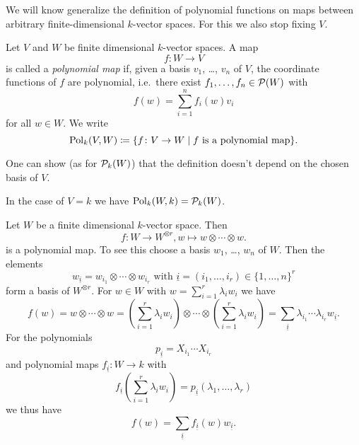 We will know generalize the definition of polynomial functions on maps between arbitrary finite-dimensional $k$-vector spaces. For this we also stop fixing $V$.


\begin{defi}
 Let $V$ and $W$ be finite dimensional $k$-vector spaces. A map
 \[
  f \colon W \to V
 \]
 is called a \emph{polynomial map} if, given a basis $v_1$, \dots, $v_n$ of $V$, the coordinate functions of $f$ are polynomial, i.e.\ there exist $f_1, \dotsc, f_n \in \mathcal{P}(W)$ with
 \[
  f(w) = \sum_{i=1}^n f_i(w) v_i
 \]
 for all $w \in W$. We write
 \[
  \operatorname{Pol}_k(V,W) \coloneqq \{f \colon V \to W \mid f \text{ is a polynomial map}\}.
 \]
\end{defi}


\begin{rem}
 One can show (as for $\mathcal{P}_k(W)$) that the definition doesn’t depend on the chosen basis of $V$.
\end{rem}


\begin{rem}
 In the case of $V = k$ we have $\operatorname{Pol}_k(W,k) = \mathcal{P}_k(W)$.
\end{rem}


\begin{expl}
 Let $W$ be a finite dimensional $k$-vector space. Then
 \[
  f \colon W \to W^{\otimes r}, w \mapsto w \otimes \dotsb \otimes w.
 \]
 is a polynomial map. To see this choose a basis $w_1$, \dots, $w_n$ of $W$. Then the elements
 \[
  w_{\underline{i}} = w_{i_1} \otimes \dotsb \otimes w_{i_r} \text{ with } \underline{i} = (i_1, \dotsc, i_r) \in \{1, \dotsc, n\}^r
 \]
 form a basis of $W^{\otimes r}$. For $w \in W$ with $w = \sum_{i=1}^r \lambda_i w_i$ we have
 \[
  f(w)
  = w \otimes \dotsb \otimes w
  = \left( \sum_{i=1}^r \lambda_i w_i \right) \otimes \dotsb \otimes \left( \sum_{i=1}^r \lambda_i w_i \right)
  = \sum_{\underline{i}} \lambda_{i_1} \dotsm \lambda_{i_r} w_{\underline{i}}.
 \]
 For the polynomials
 \[
  p_{\underline{i}} = X_{i_1} \dotsm X_{i_r}
 \]
 and polynomial maps $f_{\underline{i}} \colon W \to k$ with
 \[
  f_{\underline{i}}\left(\sum_{i=1}^r \lambda_i w_i\right) = p_{\underline{i}}(\lambda_1, \dotsc, \lambda_r)
 \]
 we thus have
 \[
  f(w) = \sum_{\underline{i}} f_{\underline{i}}(w) w_{\underline{i}}.
 \]
\end{expl}



